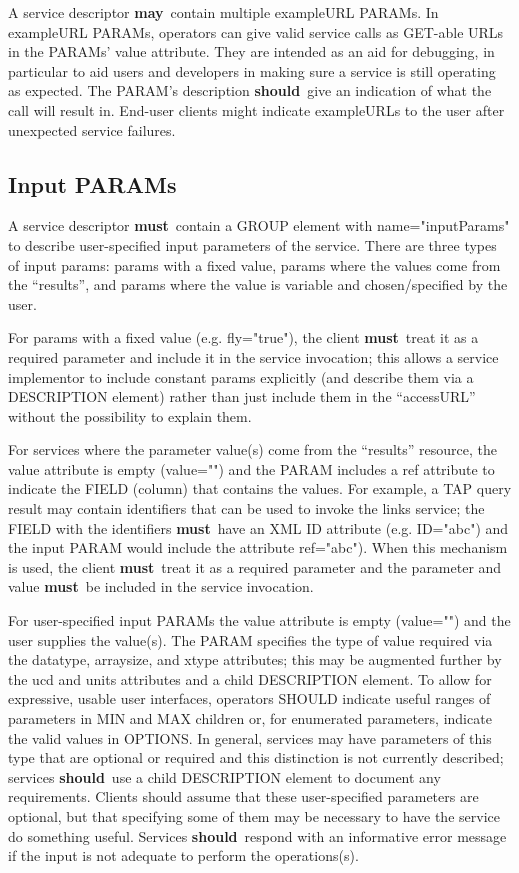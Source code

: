 \documentclass[11pt,a4paper]{ivoa}
\newcommand{\attval}[2]{#1={\allowbreak}{"}#2{"}}
\newcommand{\rfcmust}{\textbf{must}}
\newcommand{\rfcshould}{\textbf{should}}
\newcommand{\rfcmay}{\textbf{may}}
\begin{document}
A service descriptor \rfcmay\ contain multiple exampleURL PARAMs.
In exampleURL PARAMs, operators can give valid service calls as GET-able
URLs in the PARAMs' value attribute. They are intended as an aid for
debugging, in particular to aid users and developers in making sure a
service is still operating as expected. The PARAM's description \rfcshould\
give an indication of what the call will result in. End-user clients
might indicate exampleURLs to the user after unexpected service failures.

\subsection{Input PARAMs}

A service descriptor \rfcmust\ contain a GROUP element with \attval{name}{inputParams} 
to describe user-specified input parameters of the service. There are three types of 
input params: params with a fixed value, params where the values come from the 
``results'', and params where the value is variable and chosen/specified by the user.

For params with a fixed value (e.g. \attval{fly}{true}), the client \rfcmust\
treat it as a required parameter and include it in the service invocation; this allows
a service implementor to include constant params explicitly (and describe them via a 
DESCRIPTION element) rather than just include them in the ``accessURL'' without the
possibility to explain them.

For services where the parameter value(s) come from the ``results'' resource, the value 
attribute is empty (\attval{value}{}) and the PARAM includes a ref attribute to indicate 
the FIELD (column) that contains the values. For example, a TAP query result may contain 
identifiers that can be used to invoke the {links} service; the FIELD with the identifiers 
\rfcmust\ have an XML ID attribute (e.g. \attval{ID}{abc}) and the input PARAM would include 
the attribute \attval{ref}{abc}). When this mechanism is used, the client \rfcmust\
treat it as a required parameter and the parameter and value \rfcmust\ be included in 
the service invocation.

For user-specified input PARAMs the value attribute is empty (\attval{value}{}) 
and the user supplies the value(s). The PARAM specifies the type of value required via 
the datatype, arraysize, and xtype attributes; this may be augmented further by the ucd 
and units attributes and a child DESCRIPTION element. To allow for expressive, usable user
interfaces, operators SHOULD indicate useful ranges of parameters in MIN and MAX children 
or, for enumerated parameters, indicate the valid values in OPTIONS. In general, services 
may have parameters of this type that are optional or required and this distinction is 
not currently described; services \rfcshould\ use a child DESCRIPTION element to document any 
requirements. Clients should assume that these user-specified parameters are optional, but 
that specifying some of them may be necessary to have the service do something useful. 
Services \rfcshould\ respond with an informative error message if the input is not adequate to 
perform the operations(s).
\end{document}

